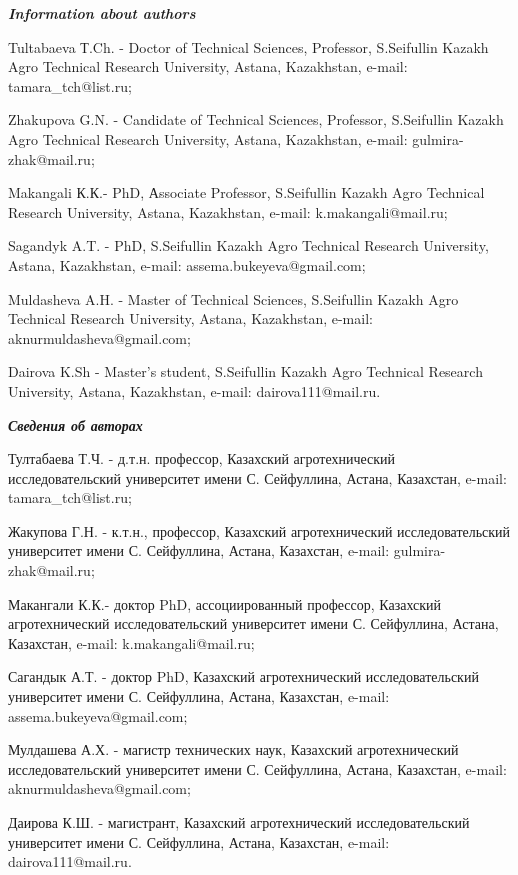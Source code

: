 \begin{info}
\hspace{1em}\emph{{\bfseries Information about authors}}

Tultabaeva Т.Ch. - Doctor of Technical Sciences, Professor, S.Seifullin
Kazakh Agro Technical Research University, Astana, Kazakhstan, e-mail:
tamara\_tch@list.ru;

Zhakupova G.N. - Candidate of Technical Sciences, Professor, S.Seifullin
Kazakh Agro Technical Research University, Astana, Kazakhstan, e-mail:
gulmira-zhak@mail.ru;

Makangali К.К.- PhD, Аssociate Professor, S.Seifullin Kazakh Agro
Technical Research University, Astana, Kazakhstan, e-mail:
k.makangali@mail.ru;

Sagandyk A.T. - PhD, S.Seifullin Kazakh Agro Technical Research
University, Astana, Kazakhstan, e-mail:
assema.bukeyeva@gmail.com;

Muldasheva A.H. - Master of Technical Sciences, S.Seifullin Kazakh Agro
Technical Research University, Astana, Kazakhstan, e-mail:
aknurmuldasheva@gmail.com;

Dairova K.Sh - Master's student, S.Seifullin Kazakh Agro Technical
Research University, Astana, Kazakhstan, e-mail:
dairova111@mail.ru.

\hspace{1em}\emph{{\bfseries Сведения об авторах}}

Тултабаева Т.Ч. - д.т.н. профессор, Казахский агротехнический
исследовательский университет имени С. Сейфуллина, Астана, Казахстан,
e-mail: tamara\_tch@list.ru;

Жакупова Г.Н. - к.т.н., профессор, Казахский агротехнический
исследовательский университет имени С. Сейфуллина, Астана, Казахстан,
e-mail:
gulmira-zhak@mail.ru;

Макангали К.К.- доктор PhD, ассоциированный профессор, Казахский
агротехнический исследовательский университет имени С. Сейфуллина,
Астана, Казахстан, e-mail:
k.makangali@mail.ru;

Сагандык А.Т. - доктор PhD, Казахский агротехнический исследовательский
университет имени С. Сейфуллина, Астана, Казахстан, e-mail:
assema.bukeyeva@gmail.com;

Мулдашева А.Х. - магистр технических наук, Казахский агротехнический
исследовательский университет имени С. Сейфуллина, Астана, Казахстан,
e-mail: aknurmuldasheva@gmail.com;

Даирова К.Ш. - магистрант, Казахский агротехнический исследовательский
университет имени С. Сейфуллина, Астана, Казахстан, e-mail:
dairova111@mail.ru.
\end{info}
